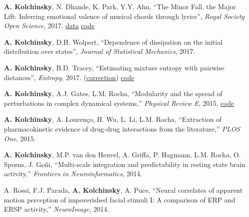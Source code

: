 \textbf{A. Kolchinsky}, N. Dhande, K. Park, Y.Y. Ahn, ``The Minor Fall, the Major Lift: Inferring emotional valence of musical chords through lyrics'', \emph{Royal Society Open Science}, 2017.  \href{https://doi.org/10.6084/m9.figshare.5413060.v1.}{data} \href{https://github.com/artemyk/chordsentiment}{code} 

\textbf{A. Kolchinsky}, D.H. Wolpert, ``Dependence of dissipation on the initial distribution over states'', \emph{Journal of Statistical Mechanics}, 2017.   

\textbf{A. Kolchinsky}, B.D. Tracey, ``Estimating mixture entropy with pairwise distances'', \emph{Entropy}, 2017. (\href{https://www.mdpi.com/1099-4300/19/11/588}{correction})  \href{https://github.com/btracey/mixent/}{code} 

\textbf{A. Kolchinsky}, A.J. Gates, L.M. Rocha, ``Modularity and the spread of perturbations in complex dynamical systems,'' \emph{Physical Review E}, 2015. 
\href{https://github.com/artemyk/perturbationmodularity/}{code} 

\textbf{A. Kolchinsky}, A. Lourenço, H. Wu, L. Li, L.M. Rocha, ``Extraction of pharmacokinetic evidence of drug-drug interactions
from the literature,'' \emph{PLOS One}, 2015.  

\textbf{A. Kolchinsky}, M.P. van den Heuvel, A. Griffa, P. Hagmann, L.M. Rocha, O. Sporns, J. Goñi, ``Multi-scale integration and predictability in resting state brain activity,'' \emph{Frontiers in Neuroinformatics}, 2014.  

A. Rossi, F.J. Parada, \textbf{A. Kolchinsky}, A. Puce, ``Neural correlates of apparent motion perception of impoverished facial stimuli I: A comparison of ERP and ERSP activity,'' \emph{NeuroImage}, 2014.  

